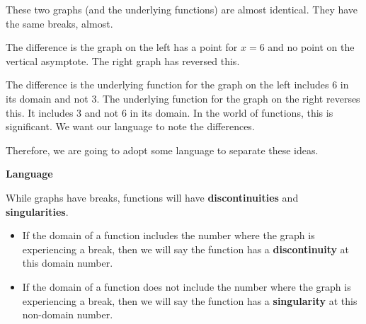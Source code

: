 \documentclass{ximera}
\begin{document}
\begin{image}
\end{image}


These two graphs (and the underlying functions) are almost identical. They have the same breaks, almost. 

The difference is the graph on the left has a point for $x=6$ and no point on the vertical asymptote.  The right graph has reversed this.

The difference is the underlying function for the graph on the left includes $6$ in its domain and not $3$. The underlying function for the graph on the right reverses this. It includes $3$ and not $6$ in its domain. In the world of functions, this is significant.  We want our language to note the differences. 

Therefore, we are going to adopt some language to separate these ideas.


\begin{idea} \textbf{\textcolor{blue!55!black}{Language}}  


While graphs have breaks, functions will have \textbf{\textcolor{blue!55!black}{discontinuities}} and \textbf{\textcolor{blue!55!black}{singularities}}.

\begin{itemize}
\item If the domain of a function includes the number where the graph is experiencing a break, then we will say the function has a \textbf{\textcolor{blue!55!black}{discontinuity}} at this domain number.  

\item If the domain of a function does not include the number where the graph is experiencing a break, then we will say the function has a \textbf{\textcolor{blue!55!black}{singularity}} at this non-domain number.
\end{itemize}

\end{idea}
\end{document}
